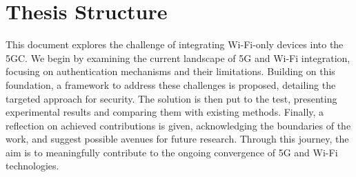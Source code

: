 \section{Thesis Structure}

This document explores the challenge of integrating Wi-Fi-only devices into the \ac{5GC}. We begin by examining the current landscape of \ac{5G} and Wi-Fi integration, focusing on authentication mechanisms and their limitations. Building on this foundation, a framework to address these challenges is proposed, detailing the targeted approach for security. The solution is then put to the test, presenting experimental results and comparing them with existing methods. Finally, a reflection on achieved contributions is given, acknowledging the boundaries of the work, and suggest possible avenues for future research. Through this journey, the aim is to meaningfully contribute to the ongoing convergence of \ac{5G} and Wi-Fi technologies.